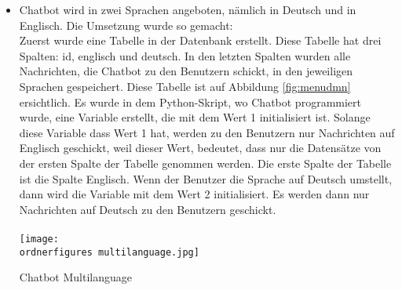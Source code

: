 \begin{itemize}
	\item Chatbot wird in zwei Sprachen angeboten, n\"amlich in Deutsch und in Englisch. Die Umsetzung wurde so gemacht: \\
		Zuerst wurde eine Tabelle in der Datenbank erstellt. Diese Tabelle hat drei Spalten: id, englisch und deutsch. In den letzten Spalten wurden alle Nachrichten, die Chatbot zu den Benutzern schickt, in den jeweiligen Sprachen gespeichert. Diese Tabelle ist auf Abbildung \ref{fig:menudmn} ersichtlich. 
		Es wurde in dem Python-Skript, wo Chatbot programmiert wurde, eine Variable erstellt, die mit dem Wert 1 initialisiert ist. Solange diese Variable dass Wert 1 hat, werden zu den Benutzern nur Nachrichten auf Englisch geschickt, weil dieser Wert, bedeutet, dass nur die Datens\"atze von der ersten Spalte der Tabelle genommen werden. Die erste Spalte der Tabelle ist die Spalte Englisch. Wenn der Benutzer die Sprache auf Deutsch umstellt, dann wird die Variable mit dem Wert 2 initialisiert. Es werden dann nur Nachrichten auf Deutsch zu den Benutzern geschickt. \\
		\\
		\captionsetup{type=figure}
		\texttt{[image: \\ordnerfigures multilanguage.jpg]}
		\caption{Chatbot Multilanguage} 
		\label{fig:menudmn}
\end{itemize}
